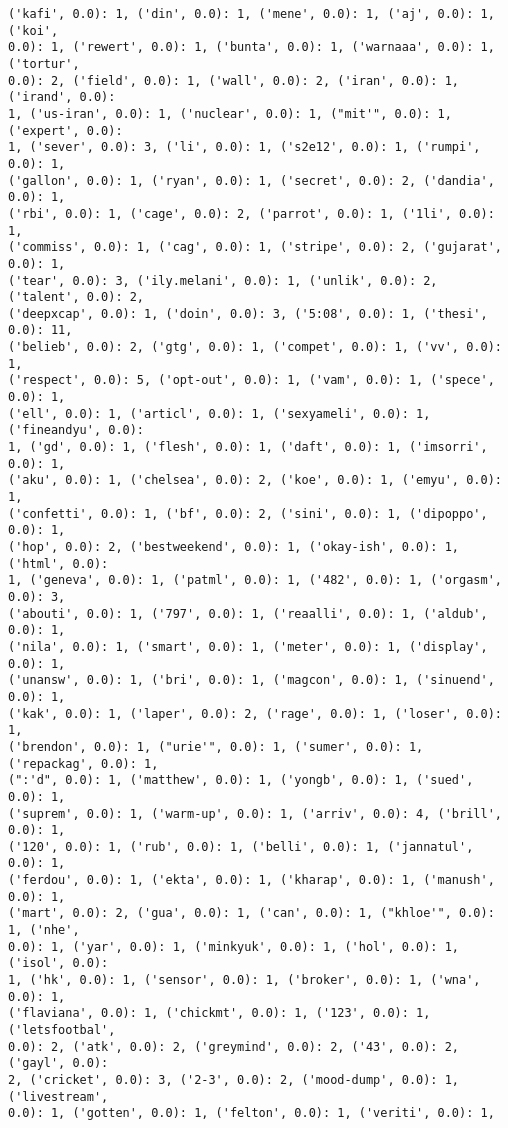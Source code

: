 \documentclass[11pt]{article}
\begin{document}
\begin{Verbatim}[commandchars=\\\{\}]
('kafi', 0.0): 1, ('din', 0.0): 1, ('mene', 0.0): 1, ('aj', 0.0): 1, ('koi',
0.0): 1, ('rewert', 0.0): 1, ('bunta', 0.0): 1, ('warnaaa', 0.0): 1, ('tortur',
0.0): 2, ('field', 0.0): 1, ('wall', 0.0): 2, ('iran', 0.0): 1, ('irand', 0.0):
1, ('us-iran', 0.0): 1, ('nuclear', 0.0): 1, ("mit'", 0.0): 1, ('expert', 0.0):
1, ('sever', 0.0): 3, ('li', 0.0): 1, ('s2e12', 0.0): 1, ('rumpi', 0.0): 1,
('gallon', 0.0): 1, ('ryan', 0.0): 1, ('secret', 0.0): 2, ('dandia', 0.0): 1,
('rbi', 0.0): 1, ('cage', 0.0): 2, ('parrot', 0.0): 1, ('1li', 0.0): 1,
('commiss', 0.0): 1, ('cag', 0.0): 1, ('stripe', 0.0): 2, ('gujarat', 0.0): 1,
('tear', 0.0): 3, ('ily.melani', 0.0): 1, ('unlik', 0.0): 2, ('talent', 0.0): 2,
('deepxcap', 0.0): 1, ('doin', 0.0): 3, ('5:08', 0.0): 1, ('thesi', 0.0): 11,
('belieb', 0.0): 2, ('gtg', 0.0): 1, ('compet', 0.0): 1, ('vv', 0.0): 1,
('respect', 0.0): 5, ('opt-out', 0.0): 1, ('vam', 0.0): 1, ('spece', 0.0): 1,
('ell', 0.0): 1, ('articl', 0.0): 1, ('sexyameli', 0.0): 1, ('fineandyu', 0.0):
1, ('gd', 0.0): 1, ('flesh', 0.0): 1, ('daft', 0.0): 1, ('imsorri', 0.0): 1,
('aku', 0.0): 1, ('chelsea', 0.0): 2, ('koe', 0.0): 1, ('emyu', 0.0): 1,
('confetti', 0.0): 1, ('bf', 0.0): 2, ('sini', 0.0): 1, ('dipoppo', 0.0): 1,
('hop', 0.0): 2, ('bestweekend', 0.0): 1, ('okay-ish', 0.0): 1, ('html', 0.0):
1, ('geneva', 0.0): 1, ('patml', 0.0): 1, ('482', 0.0): 1, ('orgasm', 0.0): 3,
('abouti', 0.0): 1, ('797', 0.0): 1, ('reaalli', 0.0): 1, ('aldub', 0.0): 1,
('nila', 0.0): 1, ('smart', 0.0): 1, ('meter', 0.0): 1, ('display', 0.0): 1,
('unansw', 0.0): 1, ('bri', 0.0): 1, ('magcon', 0.0): 1, ('sinuend', 0.0): 1,
('kak', 0.0): 1, ('laper', 0.0): 2, ('rage', 0.0): 1, ('loser', 0.0): 1,
('brendon', 0.0): 1, ("urie'", 0.0): 1, ('sumer', 0.0): 1, ('repackag', 0.0): 1,
(":'d", 0.0): 1, ('matthew', 0.0): 1, ('yongb', 0.0): 1, ('sued', 0.0): 1,
('suprem', 0.0): 1, ('warm-up', 0.0): 1, ('arriv', 0.0): 4, ('brill', 0.0): 1,
('120', 0.0): 1, ('rub', 0.0): 1, ('belli', 0.0): 1, ('jannatul', 0.0): 1,
('ferdou', 0.0): 1, ('ekta', 0.0): 1, ('kharap', 0.0): 1, ('manush', 0.0): 1,
('mart', 0.0): 2, ('gua', 0.0): 1, ('can', 0.0): 1, ("khloe'", 0.0): 1, ('nhe',
0.0): 1, ('yar', 0.0): 1, ('minkyuk', 0.0): 1, ('hol', 0.0): 1, ('isol', 0.0):
1, ('hk', 0.0): 1, ('sensor', 0.0): 1, ('broker', 0.0): 1, ('wna', 0.0): 1,
('flaviana', 0.0): 1, ('chickmt', 0.0): 1, ('123', 0.0): 1, ('letsfootbal',
0.0): 2, ('atk', 0.0): 2, ('greymind', 0.0): 2, ('43', 0.0): 2, ('gayl', 0.0):
2, ('cricket', 0.0): 3, ('2-3', 0.0): 2, ('mood-dump', 0.0): 1, ('livestream',
0.0): 1, ('gotten', 0.0): 1, ('felton', 0.0): 1, ('veriti', 0.0): 1,

\end{Verbatim}
\end{document}
